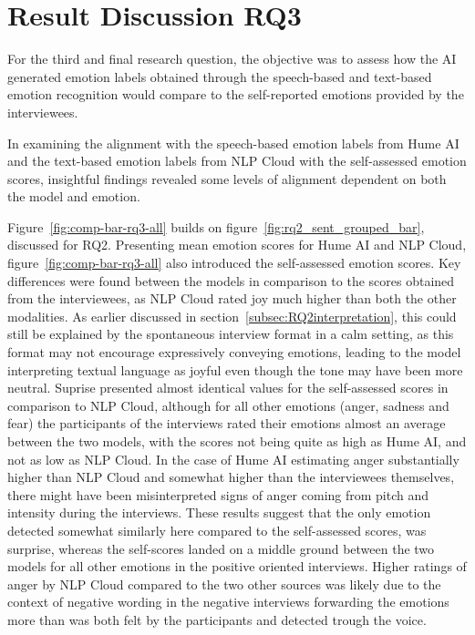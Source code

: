 
\section{Result Discussion RQ3}
For the third and final research question, the objective was to assess how the AI generated emotion labels obtained through the speech-based and text-based emotion recognition would compare to the self-reported emotions provided by the interviewees.

In examining the alignment with the speech-based emotion labels from Hume AI and the text-based emotion labels from NLP Cloud with the self-assessed emotion scores, insightful findings revealed some levels of alignment dependent on both the model and emotion.

Figure~\ref{fig:comp-bar-rq3-all} builds on figure~\ref{fig:rq2_sent_grouped_bar}, discussed for RQ2. Presenting mean emotion scores for Hume AI and NLP Cloud, figure~\ref{fig:comp-bar-rq3-all} also introduced the self-assessed emotion scores.
Key differences were found between the models in comparison to the scores obtained from the interviewees, as NLP Cloud rated joy much higher than both the other modalities. As earlier discussed in section~\ref{subsec:RQ2interpretation}, this could still be explained by the spontaneous interview format in a calm setting, as this format may not encourage expressively conveying emotions, leading to the model interpreting textual language as joyful even though the tone may have been more neutral.
Suprise presented almost identical values for the self-assessed scores in comparison to NLP Cloud, although for all other emotions (anger, sadness and fear) the participants of the interviews rated their emotions almost an average between the two models, with the scores not being quite as high as Hume AI, and not as low as NLP Cloud. In the case of Hume AI estimating anger substantially higher than NLP Cloud and somewhat higher than the interviewees themselves, there might have been misinterpreted signs of anger coming from pitch and intensity during the interviews. These results suggest that the only emotion detected somewhat similarly here compared to the self-assessed scores, was surprise, whereas the self-scores landed on a middle ground between the two models for all other emotions in the positive oriented interviews.
Higher ratings of anger by NLP Cloud compared to the two other sources was likely due to the context of negative wording in the negative interviews forwarding the emotions more than was both felt by the participants and detected trough the voice.
